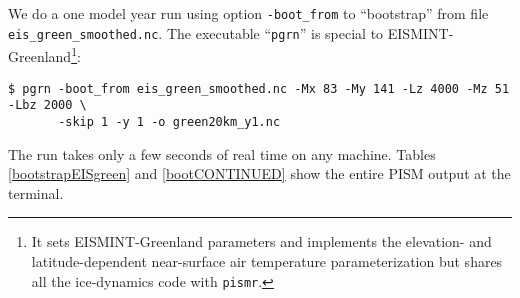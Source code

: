 We do a one model year run using option \texttt{-boot_from} to ``bootstrap'' from file \texttt{eis_green_smoothed.nc}.  The executable ``\texttt{pgrn}'' is special to EISMINT-Greenland\footnote{It sets EISMINT-Greenland parameters and implements the elevation- and latitude-dependent near-surface air temperature parameterization but shares all the ice-dynamics code with \texttt{pismr}.}: 
\begin{verbatim}
$ pgrn -boot_from eis_green_smoothed.nc -Mx 83 -My 141 -Lz 4000 -Mz 51 -Lbz 2000 \
       -skip 1 -y 1 -o green20km_y1.nc
\end{verbatim}%
\noindent The run takes only a few seconds of real time on any machine.  Tables \ref{bootstrapEISgreen} and \ref{bootCONTINUED} show the entire PISM output at the terminal.

